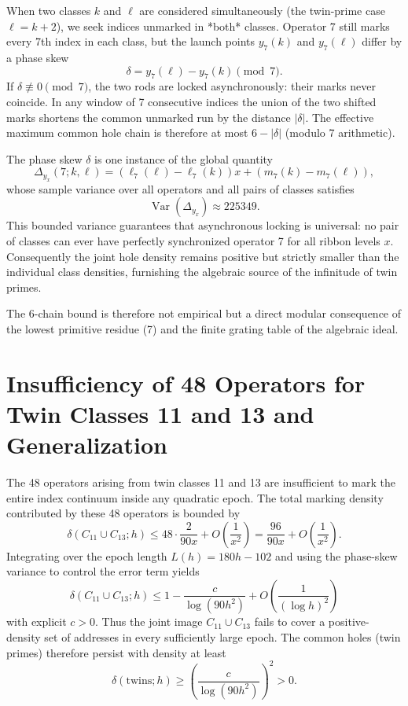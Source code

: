 \documentclass[11pt,a4paper]{article}
\begin{document}
When two classes \(k\) and \(\ell\) are considered simultaneously (the twin-prime case \(\ell=k+2\)), we seek indices unmarked in *both* classes. Operator 7 still marks every 7th index in each class, but the launch points \(y_7(k)\) and \(y_7(\ell)\) differ by a phase skew
\[
\delta = y_7(\ell)-y_7(k) \pmod{7}.
\]
If \(\delta\not\equiv0\pmod{7}\), the two rods are locked asynchronously: their marks never coincide. In any window of 7 consecutive indices the union of the two shifted marks shortens the common unmarked run by the distance \(|\delta|\). The effective maximum common hole chain is therefore at most \(6-|\delta|\) (modulo 7 arithmetic).

The phase skew \(\delta\) is one instance of the global quantity
\[
\Delta_{y_x}(7;k,\ell)=(\ell_7(\ell)-\ell_7(k))x+(m_7(k)-m_7(\ell)),
\]
whose sample variance over all operators and all pairs of classes satisfies
\[
\operatorname{Var}(\Delta_{y_x})\approx225349.
\]
This bounded variance guarantees that asynchronous locking is universal: no pair of classes can ever have perfectly synchronized operator 7 for all ribbon levels \(x\). Consequently the joint hole density remains positive but strictly smaller than the individual class densities, furnishing the algebraic source of the infinitude of twin primes.

The 6-chain bound is therefore not empirical but a direct modular consequence of the lowest primitive residue (7) and the finite grating table of the algebraic ideal.


\section{Insufficiency of 48 Operators for Twin Classes 11 and 13 and Generalization}

The 48 operators arising from twin classes 11 and 13 are insufficient to mark the entire index continuum inside any quadratic epoch. The total marking density contributed by these 48 operators is bounded by
\[
\delta(C_{11} \cup C_{13}; h) \le 48 \cdot \frac{2}{90x} + O\left( \frac{1}{x^2} \right) = \frac{96}{90x} + O\left( \frac{1}{x^2} \right).
\]
Integrating over the epoch length \(L(h) = 180h - 102\) and using the phase-skew variance to control the error term yields
\[
\delta(C_{11} \cup C_{13}; h) \le 1 - \frac{c}{\log(90h^2)} + O\left( \frac{1}{(\log h)^2} \right)
\]
with explicit \(c > 0\). Thus the joint image \(C_{11} \cup C_{13}\) fails to cover a positive-density set of addresses in every sufficiently large epoch. The common holes (twin primes) therefore persist with density at least
\[
\delta(\text{twins}; h) \ge \left( \frac{c}{\log(90h^2)} \right)^2 > 0.
\]
\end{document}
